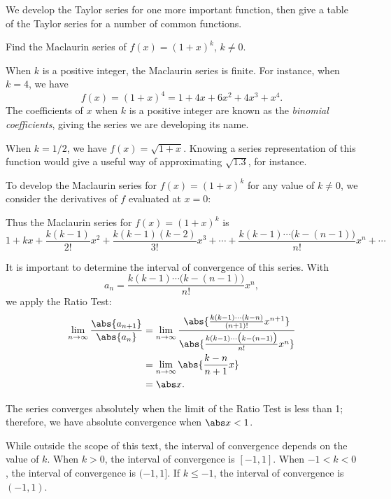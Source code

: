 We develop the Taylor series for one more important function, then give a table of the Taylor series for a number of common functions.

{Find the Maclaurin series of $f(x) = (1+x)^k$, $k\neq 0$.}
{When $k$ is a positive integer, the Maclaurin series is finite. For instance, when $k=4$, we have 
\[f(x) = (1+x)^4 = 1+4x+6x^2+4x^3+x^4.\]
The coefficients of $x$ when $k$ is a positive integer are known as the \emph{binomial coefficients}, giving the series we are developing its name.

When $k=1/2$, we have $f(x) = \sqrt{1+x}$. Knowing a series representation of this function would give a useful way of approximating $\sqrt{1.3}$, for instance.

To develop the Maclaurin series for $f(x) = (1+x)^k$ for any value of $k\neq0$, we consider the derivatives of $f$ evaluated at $x=0$:


Thus the Maclaurin series for $f(x) = (1+x)^k$ is
\[
1+ kx + \frac{k(k-1)}{2!}x^2 + \frac{k(k-1)(k-2)}{3!}x^3 + \dotsb + \frac{k(k-1)\dotsm\big(k-(n-1)\big)}{n!}x^n+\dotsb
\]

It is important to determine the interval of convergence of this series. With 
\[a_n = \frac{k(k-1)\dotsm\big(k-(n-1)\big)}{n!}x^n,\]
we apply the Ratio Test:
\begin{align*}
	\lim_{n\to\infty}\frac{\abs{a_{n+1}}}{\abs{a_n}}
	&=\lim_{n\to\infty}\frac{\abs{\frac{k(k-1)\dotsm(k-n)}{(n+1)!}x^{n+1}}}{\abs{\frac{k(k-1)\dotsm\big(k-(n-1)\big)}{n!}x^n}}\\
		&=\lim_{n\to\infty} \abs{\frac{k-n}{n+1}x}\\
		&= \abs x.
\end{align*}

The series converges absolutely when the limit of the Ratio Test is less than 1; therefore, we have absolute convergence when $\abs x<1$. 

While outside the scope of this text, the interval of convergence depends on the value of $k$. When $k>0$, the interval of convergence is $[-1,1]$. When $-1<k<0$, the interval of convergence is $(-1,1]$. If $k\leq -1$, the interval of convergence is $(-1,1)$.
}

